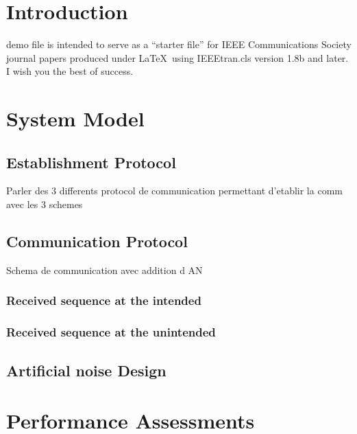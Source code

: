 \documentclass[journal,comsoc]{IEEEtran}
\begin{document}
\section{Introduction}
 demo file is intended to serve as a ``starter file''
for IEEE Communications Society journal papers produced under \LaTeX\ using
IEEEtran.cls version 1.8b and later.
I wish you the best of success.







\section{System Model}

\subsection{Establishment Protocol}
{\color{red}Parler des 3 differents protocol de communication permettant d'etablir la comm avec les 3 schemes}



\subsection{Communication Protocol}
{\color{red}Schema de communication avec addition d AN}

\subsubsection{Received sequence at the intended }
\subsubsection{Received sequence at the unintended}

\subsection{Artificial noise Design}



\section{Performance Assessments}
\end{document}
